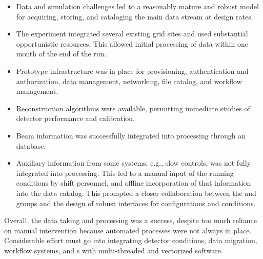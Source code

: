 \begin{itemize}
    \item Data and simulation challenges led to a reasonably mature and robust model for acquiring, storing, and cataloging the main data stream at design rates.
    \item The experiment integrated several existing grid sites and used substantial opportunistic resources.  This allowed initial processing of data within one month of the end of the run.
    \item Prototype infrastructure was in place for provisioning, authentication and authorization, data management, networking, file catalog, and workflow management. 
    \item Reconstruction algorithms were available, permitting immediate studies of detector performance and calibration. 
    \item Beam information was successfully integrated into processing through %
    an  database.
    \item Auxiliary information from some systems, e.g., slow controls, was not fully integrated into processing. This led to a manual input of the running conditions by shift personnel, and offline incorporation of that information into the data catalog. This prompted a closer collaboration between the  and  groups and the design of robust interfaces for configurations and conditions. 
\end{itemize}

Overall, the  data taking and processing was a success, despite too much reliance on manual intervention %
because  automated processes were not always in place. 
Considerable effort must go into integrating detector conditions, data migration, workflow systems, and s with multi-threaded and vectorized software.
